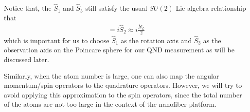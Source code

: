 \documentclass[]{report}
\begin{document}
Notice that, the $ \hat{S}_1 $ and $ \hat{S}_3 $ still satisfy the usual $ SU(2) $ Lie algebra relationship that 
\begin{align}
[\hat{S}_3,\hat{S}_1] = i \hat{S}_2 \approx i\frac{\dot{N}_L}{2}
\end{align}
which is important for us to choose $ \hat{S}_1 $ as the rotation axis and $ \hat{S}_3 $ as the observation axis on the Poincare sphere for our QND measurement as will be discussed later. 



Similarly, when the atom number is large, one can also map the angular momentum/spin operators to the quadrature operators. However, we will try to avoid applying this approximation to the spin operators, since the total number of the atoms are not too large in the context of the nanofiber platform. 
\end{document}
